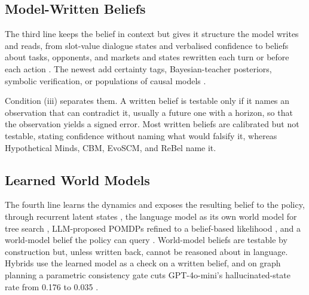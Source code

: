 \subsection{Model-Written Beliefs}
\label{sec:repr:written}

The third line keeps the belief in context but gives it structure the model writes and reads, from slot-value dialogue states and verbalised confidence \citep{lee2021dialogue,lin2022teaching,kadavath2022language} to beliefs about tasks, opponents, and markets \citep{kim2024qube,christakopoulou2024agents,cross2024hypothetical,yu2024fincon} and states rewritten each turn or before each action \citep{zhou2025mem1,kim2025reflact,kim2025coex}. The newest add certainty tags, Bayesian-teacher posteriors, symbolic verification, or populations of causal models \citep{singh2026agent,cui2026distilling,xu2026should,zhao2026evoscm}.

Condition (iii) separates them. A written belief is testable only if it names an observation that can contradict it, usually a future one with a horizon, so that the observation yields a signed error. Most written beliefs are calibrated but not testable, stating confidence without naming what would falsify it, whereas Hypothetical Minds, CBM, EvoSCM, and ReBel \citep{tang2026rewarding} name it.


\subsection{Learned World Models}
\label{sec:repr:wm}

The fourth line learns the dynamics and exposes the resulting belief to the policy, through recurrent latent states \citep{ha2018world,hafner2019learning,hafner2023mastering}, the language model as its own world model for tree search \citep{hao2023reasoning,zhao2023large,zhou2023language}, LLM-proposed POMDPs refined to a belief-based likelihood \citep{six2026learning}, and a world-model belief the policy can query \citep{kumar2026towards,li2026bridging,zuo2026qwenagentworld}. World-model beliefs are testable by construction but, unless written back, cannot be reasoned about in language. Hybrids use the learned model as a check on a written belief, and on graph planning a parametric consistency gate cuts GPT-4o-mini's hallucinated-state rate from 0.176 to 0.035 \citep{song2026agent}. 

